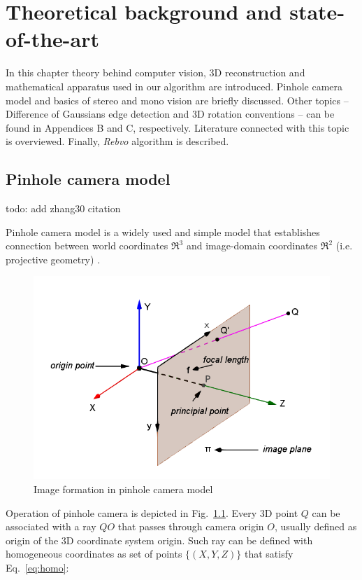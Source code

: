 \chapter{Theoretical background and state-of-the-art}
\label{cha:intro}


In this chapter theory behind computer vision, 3D reconstruction and mathematical apparatus used in our algorithm are introduced. Pinhole camera model and basics of stereo and mono vision are briefly discussed. Other topics -- Difference of Gaussians edge detection and 3D rotation conventions -- can be found in Appendices B and C, respectively. Literature connected with this topic is overviewed. Finally, \textit{Rebvo} algorithm \cite{jose2015realtime} is described.


\section{Pinhole camera model}
\label{sec:pinhole}

todo: add zhang30 citation

Pinhole camera model is a widely used and simple model that establishes connection between world coordinates $\Re^3$ and image-domain coordinates $\Re^2$ (i.e. projective geometry) \cite{hartley2003multiple}.

\begin{figure}[ht]
	\centering\includegraphics[width=0.6\linewidth]{img/projective.PNG}
	\caption{Image formation in pinhole camera model \cite{szczesny}}
	\label{fig:projective}
\end{figure}

Operation of pinhole camera is depicted in Fig.~\ref{fig:projective}. Every 3D point $Q$ can be associated with a ray $QO$ that passes through camera origin $O$, usually defined as origin of the 3D coordinate system origin. Such ray can be defined with homogeneous coordinates as set of points $\{(X, Y, Z)\}$ that satisfy Eq.~\ref{eq:homo}:


